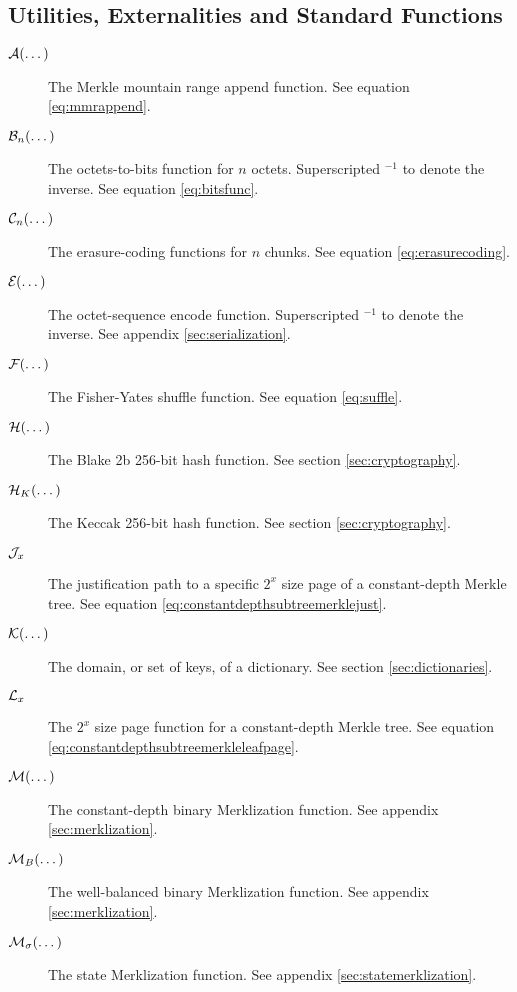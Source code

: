 \subsection{Utilities, Externalities and Standard Functions}

\begin{description}
  \item[$\mathcal{A}(\dots)$] The Merkle mountain range append function. See equation \ref{eq:mmrappend}.
  \item[$\mathcal{B}_{n}(\dots)$] The octets-to-bits function for $n$ octets. Superscripted ${}^{-1}$ to denote the inverse. See equation \ref{eq:bitsfunc}.
  \item[$\mathcal{C}_{n}(\dots)$] The erasure-coding functions for $n$ chunks. See equation \ref{eq:erasurecoding}.
  \item[$\encode{\dots}$] The octet-sequence encode function. Superscripted ${}^{-1}$ to denote the inverse. See appendix \ref{sec:serialization}.
  \item[$\mathcal{F}(\dots)$] The Fisher-Yates shuffle function. See equation \ref{eq:suffle}.
  \item[$\blake{\dots}$] The Blake 2b 256-bit hash function. See section \ref{sec:cryptography}.
  \item[$\keccak{\dots}$] The Keccak 256-bit hash function. See section \ref{sec:cryptography}.


  \item[$\mathcal{J}_{x}$] The justification path to a specific $2^x$ size page of a constant-depth Merkle tree. See equation \ref{eq:constantdepthsubtreemerklejust}.
  \item[$\keys{\dots}$] The domain, or set of keys, of a dictionary. See section \ref{sec:dictionaries}.
  \item[$\mathcal{L}_{x}$] The $2^x$ size page function for a constant-depth Merkle tree. See equation \ref{eq:constantdepthsubtreemerkleleafpage}.
  \item[$\merklizecd{\dots}$] The constant-depth binary Merklization function. See appendix \ref{sec:merklization}.
  \item[$\merklizewb{\dots}$] The well-balanced binary Merklization function. See appendix \ref{sec:merklization}.
  \item[$\merklizestate{\dots}$] The state Merklization function. See appendix \ref{sec:statemerklization}.


\end{description}
